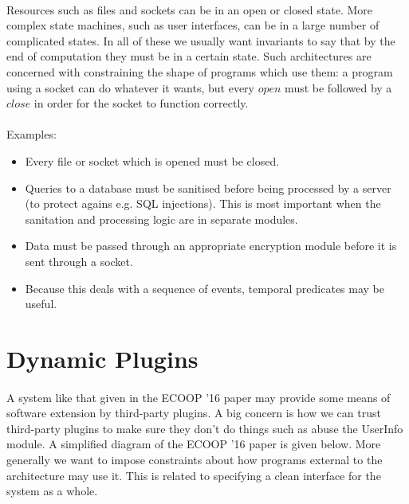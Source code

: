 \documentclass{article}
\begin{document}
\paragraph{}
Resources such as files and sockets can be in an open or closed state. More complex state machines, such as user interfaces, can be in a large number of complicated states. In all of these we usually want invariants to say that by the end of computation they must be in a certain state. Such architectures are concerned with constraining the shape of programs which use them: a program using a socket can do whatever it wants, but every $open$ must be followed by a $close$ in order for the socket to function correctly.

\paragraph{}
Examples:
\begin{itemize}
	\item Every file or socket which is opened must be closed.
	\item Queries to a database must be sanitised before being processed by a server (to protect agains e.g. SQL injections). This is most important when the sanitation and processing logic are in separate modules.
	\item Data must be passed through an appropriate encryption module before it is sent through a socket.
	\item Because this deals with a sequence of events, temporal predicates may be useful.
\end{itemize}

\section{Dynamic Plugins}

\paragraph{}
A system like that given in the ECOOP '16 paper may provide some means of software extension by third-party plugins. A big concern is how we can trust third-party plugins to make sure they don't do things such as abuse the UserInfo module. A simplified diagram of the ECOOP '16 paper is given below. More generally we want to impose constraints about how programs external to the architecture may use it. This is related to specifying a clean interface for the system as a whole.
\end{document}

